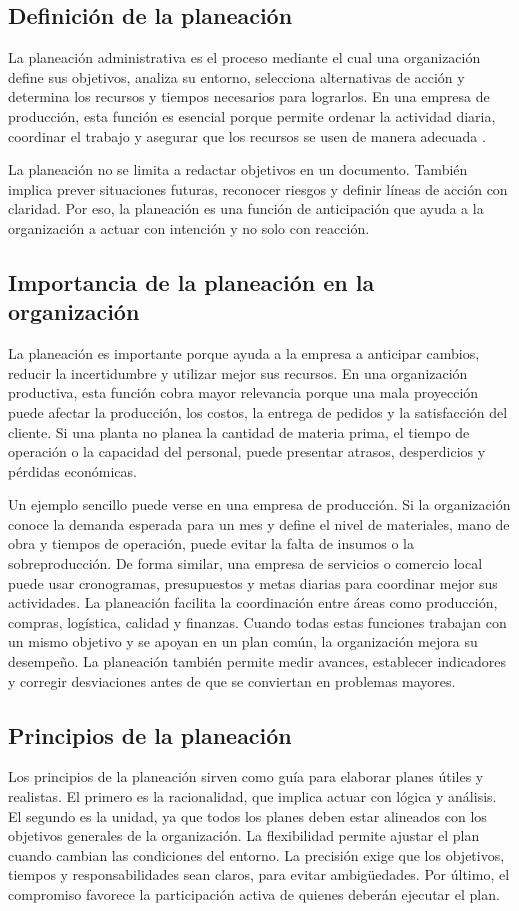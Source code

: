 \subsection{Definición de la planeación}
La planeación administrativa es el proceso mediante el cual una organización define sus objetivos, analiza su entorno, selecciona alternativas de acción y determina los recursos y tiempos necesarios para lograrlos. En una empresa de producción, esta función es esencial porque permite ordenar la actividad diaria, coordinar el trabajo y asegurar que los recursos se usen de manera adecuada \parencite{koontz2015}.

La planeación no se limita a redactar objetivos en un documento. También implica prever situaciones futuras, reconocer riesgos y definir líneas de acción con claridad. Por eso, la planeación es una función de anticipación que ayuda a la organización a actuar con intención y no solo con reacción.

\subsection{Importancia de la planeación en la organización}
La planeación es importante porque ayuda a la empresa a anticipar cambios, reducir la incertidumbre y utilizar mejor sus recursos. En una organización productiva, esta función cobra mayor relevancia porque una mala proyección puede afectar la producción, los costos, la entrega de pedidos y la satisfacción del cliente. Si una planta no planea la cantidad de materia prima, el tiempo de operación o la capacidad del personal, puede presentar atrasos, desperdicios y pérdidas económicas.

Un ejemplo sencillo puede verse en una empresa de producción. Si la organización conoce la demanda esperada para un mes y define el nivel de materiales, mano de obra y tiempos de operación, puede evitar la falta de insumos o la sobreproducción. De forma similar, una empresa de servicios o comercio local puede usar cronogramas, presupuestos y metas diarias para coordinar mejor sus actividades. La planeación facilita la coordinación entre áreas como producción, compras, logística, calidad y finanzas. Cuando todas estas funciones trabajan con un mismo objetivo y se apoyan en un plan común, la organización mejora su desempeño. La planeación también permite medir avances, establecer indicadores y corregir desviaciones antes de que se conviertan en problemas mayores.

\subsection{Principios de la planeación}
Los principios de la planeación sirven como guía para elaborar planes útiles y realistas. El primero es la racionalidad, que implica actuar con lógica y análisis. El segundo es la unidad, ya que todos los planes deben estar alineados con los objetivos generales de la organización. La flexibilidad permite ajustar el plan cuando cambian las condiciones del entorno. La precisión exige que los objetivos, tiempos y responsabilidades sean claros, para evitar ambigüedades. Por último, el compromiso favorece la participación activa de quienes deberán ejecutar el plan.

